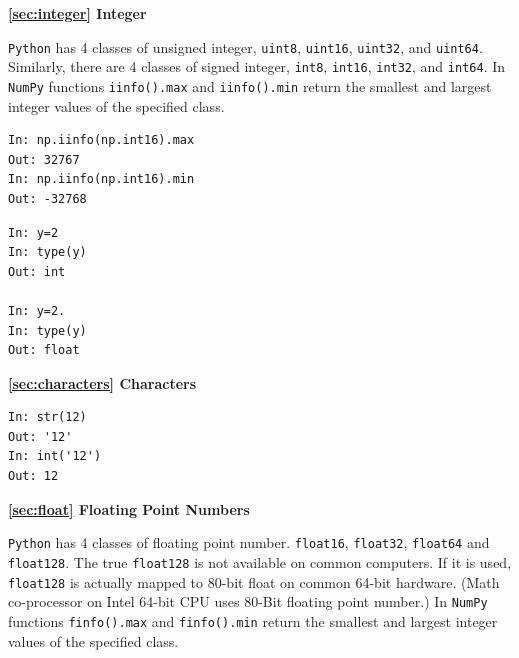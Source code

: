 \bigskip
\setcounter{exampnum}{0}
\noindent
\textbf{\ref{sec:integer} Integer}

\bigskip

\texttt{Python} has 4 classes of unsigned integer, \texttt{uint8},
\texttt{uint16},  \texttt{uint32}, and  \texttt{uint64}.  Similarly, there are 4 classes of signed integer, \texttt{int8},
\texttt{int16},  \texttt{int32}, and  \texttt{int64}.
In \texttt{NumPy} functions \texttt{iinfo().max} and \texttt{iinfo().min} return the smallest and largest integer values of the specified class. 

\begin{example}
\small
\begin{mybox}
	\begin{verbatim}
In: np.iinfo(np.int16).max
Out: 32767
In: np.iinfo(np.int16).min
Out: -32768
   \end{verbatim}
\end{mybox}
\normalsize
\end{example}

\noindent
\begin{example}
\small
\begin{mybox}
	\begin{verbatim}
In: y=2
In: type(y)
Out: int

In: y=2.
In: type(y)
Out: float
   \end{verbatim}
\end{mybox}
\normalsize
\end{example}

\bigskip
\textbf{\ref{sec:characters} Characters}
\bigskip
\begin{example}
\small
\begin{mybox}
	\begin{verbatim}
In: str(12)
Out: '12'
In: int('12')
Out: 12
   \end{verbatim}
\end{mybox}
\normalsize
\end{example}

\bigskip
\textbf{\ref{sec:float} Floating Point Numbers}
\bigskip

\texttt{Python} has 4 classes of floating point number.
\texttt{float16},  \texttt{float32}, \texttt{float64} and \texttt{float128}.  The true \texttt{float128} is not available on common computers.  If it is used, \texttt{float128} is actually mapped to 80-bit float on common 64-bit hardware. (Math co-processor on Intel 64-bit CPU uses 80-Bit floating point number.)  In \texttt{NumPy} functions \texttt{finfo().max} and \texttt{finfo().min} return the smallest and largest integer values of the specified class.

